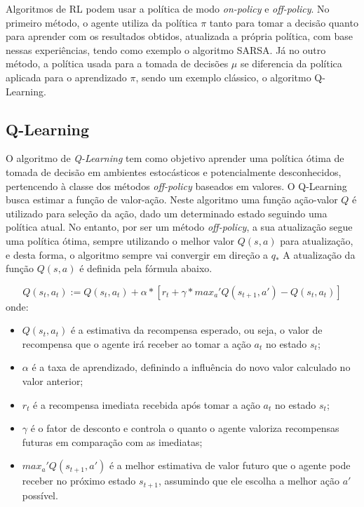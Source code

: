 Algoritmos de RL podem usar a política de modo \textit{on-policy} e \textit{off-policy}.
No primeiro método, o agente utiliza da política \(\pi\) tanto para tomar a decisão 
quanto para aprender com os resultados obtidos, atualizada a própria política, 
com base nessas experiências, tendo como exemplo o algoritmo SARSA. Já no outro método, a política
usada para a tomada de decisões \(\mu\) se diferencia da política aplicada para o 
aprendizado \(\pi\), sendo um exemplo clássico, o algoritmo Q-Learning.



\subsection{Q-Learning}
O algoritmo de \textit{Q-Learning} \cite{watkins1992} tem como objetivo aprender uma política ótima 
de tomada de decisão em ambientes estocásticos e potencialmente desconhecidos, pertencendo à classe dos 
métodos \textit{off-policy} baseados em valores. O Q-Learning busca estimar a função de valor-ação. Neste
algoritmo uma função ação-valor \(Q\) é utilizado para seleção da ação, dado um determinado
estado seguindo uma política atual. No entanto, por ser um método \textit{off-policy}, a sua 
atualização segue uma política ótima, sempre utilizando o melhor valor \(Q(s,a)\) para atualização, e desta
forma, o algoritmo sempre vai convergir em direção a \(q_{*}\) \cite{Sutton}
A atualização da função \(Q(s, a)\) é definida pela fórmula abaixo.


\begin{equation}
    Q(s_{t}, a_{t}) := Q(s_{t}, a_{t}) + \alpha * [r_{t} + \gamma * max_a' Q(s_{t+1}, a') - Q(s_{t}, a_{t})]
\end{equation}
onde:
\begin{itemize}
    \item \(Q(s_{t}, a_{t})\) é a estimativa da recompensa esperado, ou seja, o valor de recompensa que o agente
    irá receber ao tomar a ação \(a_{t}\) no estado \(s_{t}\);
    \item \(\alpha\) é a taxa de aprendizado, definindo a influência do novo valor calculado no valor anterior;
    \item \(r_{t}\) é a recompensa imediata recebida após tomar a ação \(a_t\) no estado \(s_{t}\);
    \item \(\gamma\) é o fator de desconto e controla o quanto o agente valoriza recompensas futuras em 
    comparação com as imediatas;
    \item \(max_a' Q(s_{t+1}, a')\) é a melhor estimativa de valor futuro que o agente pode receber no
    próximo estado \(s_{t+1}\), assumindo que ele escolha a melhor ação \(a'\) possível.
\end{itemize}

